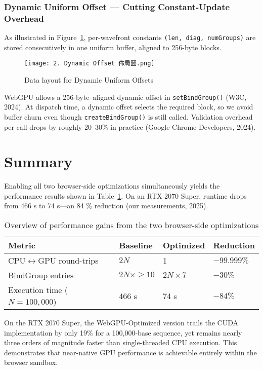 \documentclass[PhD]{PHlab-thesis}
\begin{document}
\subsubsection{Dynamic Uniform Offset — Cutting Constant-Update Overhead}
As illustrated in Figure~\ref{fig:dynamic-offset-layout}, per-wavefront constants \texttt{(len, diag, numGroups)} are stored consecutively in one uniform buffer, aligned to 256-byte blocks.

\begin{figure}[htbp]
    \centering
    \texttt{[image: 2. Dynamic Offset 佈局圖.png]}
    \caption{Data layout for Dynamic Uniform Offsets}
    \label{fig:dynamic-offset-layout}
\end{figure}

WebGPU allows a 256-byte–aligned dynamic offset in \texttt{setBindGroup()} (W3C, 2024). At dispatch time, a dynamic offset selects the required block, so we avoid buffer churn even though \texttt{createBindGroup()} is still called. Validation overhead per call drops by roughly 20–30\% in practice (Google Chrome Developers, 2024).

\section{Summary}
Enabling all two browser-side optimizations simultaneously yields the performance results shown in Table~\ref{tab:opt_performance}. On an RTX 2070 Super, runtime drops from 466 s to 74 s—an 84 \% reduction (our measurements, 2025).
\begin{table}[h]
    \centering
    \setlength{\tabcolsep}{6pt}
    \renewcommand{\arraystretch}{1.4}
    \small
    \begin{tabularx}{\textwidth}{|X|X|X|X|}
        \hline
        Metric & Baseline & Optimized & Reduction \\
        \hline
        CPU$\leftrightarrow$GPU round-trips & $2N$ & 1 & $-99.999\%$ \\
        BindGroup entries & $2N \times \geq 10$ & $2N \times 7$ & $-30\%$ \\
        Execution time ($N = 100{,}000$) & 466 s & 74 s & $-84\%$ \\
        \hline
    \end{tabularx}
    \caption{Overview of performance gains from the two browser-side optimizations}
    \label{tab:opt_performance}
\end{table}
On the RTX 2070 Super, the WebGPU-Optimized version trails the CUDA implementation by only 19\% for a 100,000-base sequence, yet remains nearly three orders of magnitude faster than single-threaded CPU execution. This demonstrates that near-native GPU performance is achievable entirely within the browser sandbox.
\end{document}
